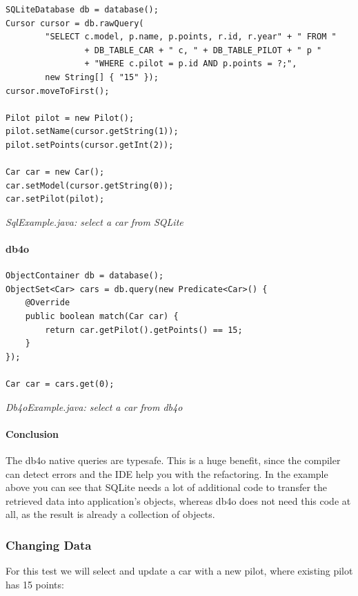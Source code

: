 \begin{lstlisting}
SQLiteDatabase db = database();
Cursor cursor = db.rawQuery(
        "SELECT c.model, p.name, p.points, r.id, r.year" + " FROM "
                + DB_TABLE_CAR + " c, " + DB_TABLE_PILOT + " p "
                + "WHERE c.pilot = p.id AND p.points = ?;",
        new String[] { "15" });
cursor.moveToFirst();

Pilot pilot = new Pilot();
pilot.setName(cursor.getString(1));
pilot.setPoints(cursor.getInt(2));

Car car = new Car();
car.setModel(cursor.getString(0));
car.setPilot(pilot);
\end{lstlisting}

{\small\itshape SqlExample.java: select a car from SQLite\par}
\medskip

\paragraph*{db4o}

\begin{lstlisting}
ObjectContainer db = database();
ObjectSet<Car> cars = db.query(new Predicate<Car>() {
    @Override
    public boolean match(Car car) {
        return car.getPilot().getPoints() == 15;
    }
});

Car car = cars.get(0);
\end{lstlisting}

{\small\itshape Db4oExample.java: select a car from db4o\par}
\medskip

\paragraph*{Conclusion}

The db4o native queries are typesafe. This is a huge benefit, since the compiler can detect errors and the IDE help you with the refactoring. In the example above you can see that SQLite needs a lot of additional code to transfer the retrieved data into application's objects, whereas db4o does not need this code at all, as the result is already a collection of objects.

\subsubsection{Changing Data}
\label{ref:platform-specific-issues-android-changing-data}

For this test we will select and update a car with a new pilot, where existing pilot has 15 points:

